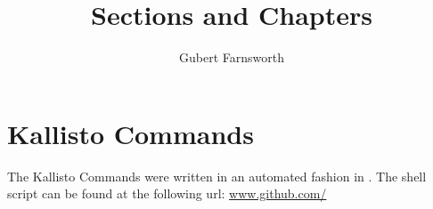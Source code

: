 \documentclass{article}
\title{Sections and Chapters}
\author{Gubert Farnsworth}
\date{ }
\begin{document}
 \maketitle
 \tableofcontents

 \section{Kallisto Commands}

 The Kallisto Commands were written in an automated fashion in . The shell script can be found at the following url: \url{www.github.com/}
\end{document}
